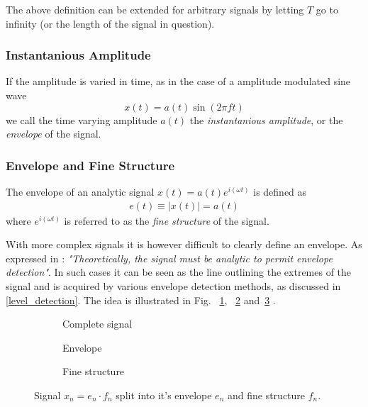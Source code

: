 \documentclass[../main2.tex]{subfiles}
\providecommand{\rootdir}{..}
\begin{document}
The above definition can be extended for arbitrary signals by letting $T$ go to infinity (or the length of the signal in question).

\subsubsection{Instantanious Amplitude}
If the amplitude is varied in time, as in the case of a amplitude modulated sine wave
\begin{equation}
x(t) = a(t) \sin (2 \pi f t)
\end{equation}
we call the time varying amplitude $a(t)$ the \emph{instantanious amplitude}, or the \emph{envelope} of the signal.

\subsubsection{Envelope and Fine Structure}
The envelope of an analytic signal $x(t) = a(t)e^{i(\omega t)}$ is defined as \cite{bedrosian1962analytic}
\begin{align}
e(t) \equiv |x(t)| = a(t)
\end{align}
where $e^{i(\omega t)}$ is referred to as the \emph{fine structure} of the signal.

With more complex signals it is however difficult to clearly define an envelope. As expressed in \cite{bedrosian1962analytic}: \emph{"Theoretically, the signal must be analytic to permit envelope detection"}. In such cases it can be seen as the line outlining the extremes of the signal and is acquired by various envelope detection methods, as discussed in \ref{level_detection}. The idea is illustrated in Fig. ~\ref{fig:signal_env_fine_struct}, ~\ref{fig:signal_env} and~\ref{fig:signal_fine_struct} . 
\begin{figure}
\captionsetup{justification=centering}
\begin{subfigure}{\linewidth}
\centering
\centerline{}
\caption{Complete signal}
\label{fig:signal_env_fine_struct}
\end{subfigure}
\par\bigskip
\begin{subfigure}{.5\linewidth}
\centering

\caption{Envelope}
\label{fig:signal_env}
\end{subfigure}
\begin{subfigure}{.5\linewidth}
\centering

\caption{Fine structure}
\label{fig:signal_fine_struct}
\end{subfigure}%
\caption{Signal $x_n = e_n\cdot f_n$ split into it's envelope $e_n$ and fine structure $f_n$.}
\label{fig:analytic_signal}
\end{figure}
\end{document}
